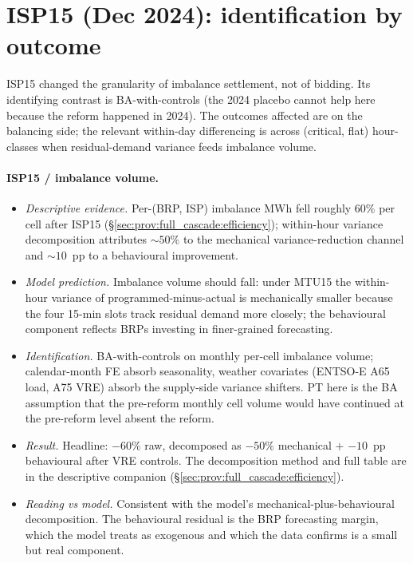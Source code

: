 \documentclass[11pt,a4paper]{article}
\begin{document}
\section{ISP15 (Dec 2024): identification by outcome}\label{sec:ident:isp15}

ISP15 changed the granularity of imbalance settlement, not of bidding. Its identifying contrast is BA-with-controls (the 2024 placebo cannot help here because the reform happened in 2024). The outcomes affected are on the balancing side; the relevant within-day differencing is across (critical, flat) hour-classes when residual-demand variance feeds imbalance volume.

\paragraph{ISP15 / imbalance volume.}
\begin{itemize}
\item \emph{Descriptive evidence.} Per-(BRP, ISP) imbalance MWh fell roughly 60\% per cell after ISP15 (\S\ref{sec:prov:full_cascade:efficiency}); within-hour variance decomposition attributes $\sim 50\%$ to the mechanical variance-reduction channel and $\sim 10$~pp to a behavioural improvement.
\item \emph{Model prediction.} Imbalance volume should fall: under MTU15 the within-hour variance of programmed-minus-actual is mechanically smaller because the four 15-min slots track residual demand more closely; the behavioural component reflects BRPs investing in finer-grained forecasting.
\item \emph{Identification.} BA-with-controls on monthly per-cell imbalance volume; calendar-month FE absorb seasonality, weather covariates (ENTSO-E A65 load, A75 VRE) absorb the supply-side variance shifters. PT here is the BA assumption that the pre-reform monthly cell volume would have continued at the pre-reform level absent the reform.
\item \emph{Result.} Headline: $-60\%$ raw, decomposed as $-50\%$ mechanical + $-10$~pp behavioural after VRE controls. The decomposition method and full table are in the descriptive companion (\S\ref{sec:prov:full_cascade:efficiency}).
\item \emph{Reading vs model.} Consistent with the model's mechanical-plus-behavioural decomposition. The behavioural residual is the BRP forecasting margin, which the model treats as exogenous and which the data confirms is a small but real component.
\end{itemize}
\end{document}
